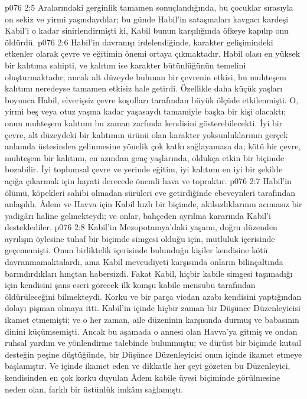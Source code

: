 \vs p076 2:5 Aralarındaki gerginlik tamamen sonuçlandığında, bu çocuklar sırasıyla on sekiz ve yirmi yaşındaydılar; bu günde Habil’in sataşmaları kavgacı kardeşi Kabil’i o kadar sinirlendirmişti ki, Kabil bunun karşılığında öfkeye kapılıp onu öldürdü.
\vs p076 2:6 Habil’in davranışı irdelendiğinde, karakter gelişimindeki etkenler olarak çevre ve eğitimin önemi ortaya çıkmaktadır. Habil olası en yüksek bir kalıtıma sahipti, ve kalıtım ise karakter bütünlüğünün temelini oluşturmaktadır; ancak alt düzeyde bulunan bir çevrenin etkisi, bu muhteşem kalıtımı neredeyse tamamen etkisiz hale getirdi. Özellikle daha küçük yaşları boyunca Habil, elverişsiz çevre koşulları tarafından büyük ölçüde etkilenmişti. O, yirmi beş veya otuz yaşına kadar yaşasaydı tamamiyle başka bir kişi olacaktı; onun muhteşem kalıtımı bu zaman zarfında kendisini gösterebilecekti. İyi bir çevre, alt düzeydeki bir kalıtımın ürünü olan karakter yoksunluklarının gerçek anlamda üstesinden gelinmesine yönelik çok katkı sağlayamasa da; kötü bir çevre, muhteşem bir kalıtımı, en azından genç yaşlarında, oldukça etkin bir biçimde bozabilir. İyi toplumsal çevre ve yerinde eğitim, iyi kalıtımı en iyi bir şekilde açığa çıkarmak için hayati derecede önemli hava ve topraktır.
\vs p076 2:7 Habil’in ölümü, köpekleri sahibi olmadan sürüleri eve getirdiğinde ebeveynleri tarafından anlaşıldı. Âdem ve Havva için Kabil hızlı bir biçimde, akılsızlıklarının acımasız bir yadigârı haline gelmekteydi; ve onlar, bahçeden ayrılma kararında Kabil’i desteklediler.
\vs p076 2:8 Kabil’in Mezopotamya’daki yaşamı, doğru düzenden ayrılışın öylesine tuhaf bir biçimde simgesi olduğu için, mutluluk içerisinde geçememişti. Onun birliktelik içerisinde bulunduğu kişiler kendisine kötü davranmamaktalardı, ama Kabil mevcudiyeti karşısında onların bilinçaltında barındırdıkları hınçtan habersizdi. Fakat Kabil, hiçbir kabile simgesi taşımadığı için kendisini şans eseri görecek ilk komşu kabile mensubu tarafından öldürüleceğini bilmekteydi. Korku ve bir parça vicdan azabı kendisini yaptığından dolayı pişman olmaya itti. Kabil’in içinde hiçbir zaman bir Düşünce Düzenleyicisi ikamet etmemişti; ve o her zaman, aile düzeninin karşısında durmuş ve babasının dinini küçümsemişti. Ancak bu aşamada o annesi olan Havva’ya gitmiş ve ondan ruhsal yardım ve yönlendirme talebinde bulunmuştu; ve dürüst bir biçimde kutsal desteğin peşine düştüğünde, bir Düşünce Düzenleyicisi onun içinde ikamet etmeye başlamıştır. Ve içinde ikamet eden ve dikkatle her şeyi gözeten bu Düzenleyici, kendisinden en çok korku duyulan Âdem kabile üyesi biçiminde görülmesine neden olan, farklı bir üstünlük imkânı sağlamıştı.
